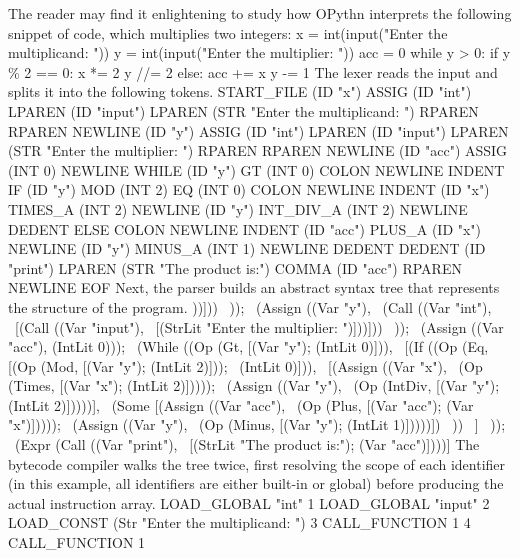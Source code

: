 The reader may find it enlightening to study how OPythn interprets the following snippet of code, which multiplies two integers:
\begincode
x = int(input("Enter the multiplicand: "))
y = int(input("Enter the multiplier: "))
acc = 0
while y > 0:
\tab if y \% 2 == 0:
\tab\tab x *= 2
\tab\tab y //= 2
\tab else:
\tab\tab acc += x
\tab\tab y -= 1
\endcode
The lexer reads the input and splits it into the following tokens.
\begincode
START\_FILE
(ID "x") ASSIG (ID "int") LPAREN (ID "input") LPAREN
\tab(STR "Enter the multiplicand: ") RPAREN RPAREN NEWLINE
(ID "y") ASSIG (ID "int") LPAREN (ID "input") LPAREN
\tab(STR "Enter the multiplier: ") RPAREN RPAREN NEWLINE
(ID "acc") ASSIG (INT 0) NEWLINE
WHILE (ID "y") GT (INT 0) COLON NEWLINE
INDENT IF (ID "y") MOD (INT 2) EQ (INT 0) COLON NEWLINE
INDENT (ID "x") TIMES\_A (INT 2) NEWLINE
(ID "y") INT\_DIV\_A (INT 2) NEWLINE
DEDENT ELSE COLON NEWLINE
INDENT (ID "acc") PLUS\_A (ID "x") NEWLINE
(ID "y") MINUS\_A (INT 1) NEWLINE
DEDENT DEDENT (ID "print") LPAREN
\tab(STR "The product is:") COMMA (ID "acc") RPAREN NEWLINE
EOF
\endcode
Next, the parser builds an abstract syntax tree that represents the structure of the program.
\begincode
[(Assign ((Var "x"),
\    (Call ((Var "int"),
\       [(Call ((Var "input"),
\        [(StrLit "Enter the multiplicand: ")]))]))
\    ));
\  (Assign ((Var "y"),
\     (Call ((Var "int"),
\        [(Call ((Var "input"),
\         [(StrLit "Enter the multiplier: ")]))]))
\     ));
\  (Assign ((Var "acc"), (IntLit 0)));
\  (While ((Op (Gt, [(Var "y"); (IntLit 0)])),
\     [(If ((Op (Eq, [(Op (Mod, [(Var "y"); (IntLit 2)]));
\                     (IntLit 0)])),
\         [(Assign ((Var "x"),
\                   (Op (Times, [(Var "x"); (IntLit 2)]))));
\           (Assign ((Var "y"),
\                    (Op (IntDiv, [(Var "y"); (IntLit 2)]))))],
\         (Some [(Assign ((Var "acc"),
\                         (Op (Plus, [(Var "acc"); (Var "x")]))));
\                 (Assign ((Var "y"),
\                          (Op (Minus, [(Var "y"); (IntLit 1)]))))])
\         ))
\       ]
\     ));
\  (Expr (Call ((Var "print"),
\         [(StrLit "The product is:"); (Var "acc")])))]
\endcode
The bytecode compiler walks the tree twice, first resolving the scope of each identifier (in this example, all identifiers are either built-in or global) before producing the actual instruction array.
        LOAD\_GLOBAL              "int"
1        LOAD\_GLOBAL              "input"
2        LOAD\_CONST               (Str "Enter the multiplicand: ")
3        CALL\_FUNCTION            1
4        CALL\_FUNCTION            1
